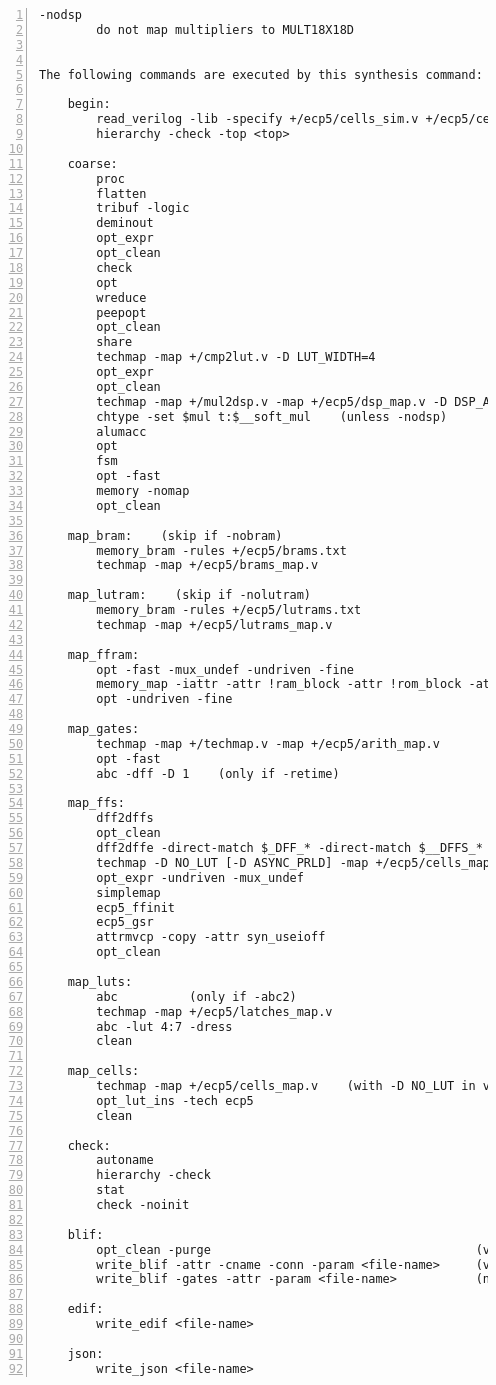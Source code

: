 \begin{lstlisting}[numbers=left,frame=single]
    -nodsp
        do not map multipliers to MULT18X18D


The following commands are executed by this synthesis command:

    begin:
        read_verilog -lib -specify +/ecp5/cells_sim.v +/ecp5/cells_bb.v
        hierarchy -check -top <top>

    coarse:
        proc
        flatten
        tribuf -logic
        deminout
        opt_expr
        opt_clean
        check
        opt
        wreduce
        peepopt
        opt_clean
        share
        techmap -map +/cmp2lut.v -D LUT_WIDTH=4
        opt_expr
        opt_clean
        techmap -map +/mul2dsp.v -map +/ecp5/dsp_map.v -D DSP_A_MAXWIDTH=18 -D DSP_B_MAXWIDTH=18  -D DSP_A_MINWIDTH=2 -D DSP_B_MINWIDTH=2  -D DSP_NAME=$__MUL18X18    (unless -nodsp)
        chtype -set $mul t:$__soft_mul    (unless -nodsp)
        alumacc
        opt
        fsm
        opt -fast
        memory -nomap
        opt_clean

    map_bram:    (skip if -nobram)
        memory_bram -rules +/ecp5/brams.txt
        techmap -map +/ecp5/brams_map.v

    map_lutram:    (skip if -nolutram)
        memory_bram -rules +/ecp5/lutrams.txt
        techmap -map +/ecp5/lutrams_map.v

    map_ffram:
        opt -fast -mux_undef -undriven -fine
        memory_map -iattr -attr !ram_block -attr !rom_block -attr logic_block -attr syn_ramstyle=auto -attr syn_ramstyle=registers -attr syn_romstyle=auto -attr syn_romstyle=logic
        opt -undriven -fine

    map_gates:
        techmap -map +/techmap.v -map +/ecp5/arith_map.v
        opt -fast
        abc -dff -D 1    (only if -retime)

    map_ffs:
        dff2dffs
        opt_clean
        dff2dffe -direct-match $_DFF_* -direct-match $__DFFS_*
        techmap -D NO_LUT [-D ASYNC_PRLD] -map +/ecp5/cells_map.v
        opt_expr -undriven -mux_undef
        simplemap
        ecp5_ffinit
        ecp5_gsr
        attrmvcp -copy -attr syn_useioff
        opt_clean

    map_luts:
        abc          (only if -abc2)
        techmap -map +/ecp5/latches_map.v
        abc -lut 4:7 -dress
        clean

    map_cells:
        techmap -map +/ecp5/cells_map.v    (with -D NO_LUT in vpr mode)
        opt_lut_ins -tech ecp5
        clean

    check:
        autoname
        hierarchy -check
        stat
        check -noinit

    blif:
        opt_clean -purge                                     (vpr mode)
        write_blif -attr -cname -conn -param <file-name>     (vpr mode)
        write_blif -gates -attr -param <file-name>           (non-vpr mode)

    edif:
        write_edif <file-name>

    json:
        write_json <file-name>
\end{lstlisting}

